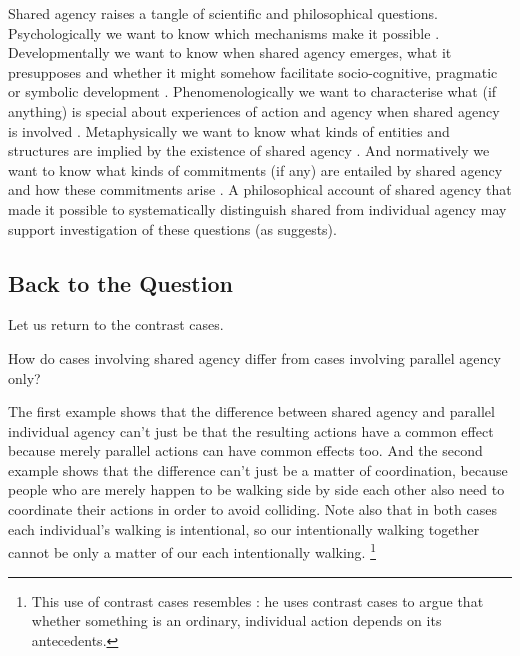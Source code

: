 \documentclass[12pt,\papersize]{extarticle}
\begin{document}
Shared agency raises a tangle of scientific and philosophical questions.  Psychologically we want to know which mechanisms make it possible \citep{Sebanz:2006yq,vesper_minimal_2010}.  
Developmentally we want to know when shared agency emerges, what it presupposes and whether it might somehow facilitate socio-cognitive, pragmatic or symbolic development \citep{Moll:2007gu,Hughes:2004zj,Brownell:2006gu}.  
Phenomenologically we want to characterise what (if anything) is special about experiences of action and agency when shared agency is involved \citep{Pacherie:2010fk}.  
Metaphysically we want to know what kinds of entities and structures are implied by the existence of shared agency \citep{Gilbert:1992rs,Searle:1994lb}.  
And normatively we want to know what kinds of commitments (if any) are entailed by shared agency and how these commitments arise \citep{Roth:2004ki}.
A philosophical account of shared agency 
that made it possible to systematically distinguish shared from individual agency  
may support investigation of these questions (as \citealp{Bratman:2009lv} suggests).  


\subsection{Back to the Question}
Let us return to the contrast cases.

How do cases involving shared agency differ from cases involving parallel agency only? 

The first example shows that the difference between shared agency and parallel individual agency can’t just be that the resulting actions have a common effect because merely parallel actions can have common effects too. 
And the second example shows that the difference can’t just be a matter of coordination, because people who are merely happen to be walking side by side each other also need to coordinate their actions in order to avoid colliding.  
Note also that in both cases each individual's walking is intentional, so our intentionally walking together cannot be  only a matter of our each intentionally walking.%
\footnote{
This use of contrast cases resembles \citet{Pears:1971fk}: he uses contrast cases to argue that whether something is an ordinary, individual action depends on its antecedents. 
} 
\end{document}
